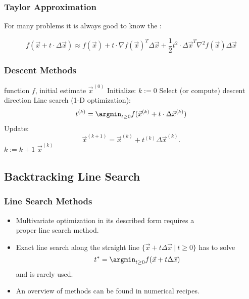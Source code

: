 \begin{frame}
  \frametitle{Taylor Approximation}
 
  For many problems it is always good to know the :

  \begin{displaymath}
    f(\vec x + t\cdot \Delta\vec x) 
    \approx f(\vec x) + t\cdot \nabla f(\vec x)^T \Delta \vec x +
      \frac{1}{2} t^2\cdot\Delta \vec x^T \nabla^2 f(\vec x)\Delta \vec x
  \end{displaymath}
\end{frame}


\begin{frame}
  \frametitle{Descent Methods \cont}
  
  \begin{algorithmic}
    \STATE {} function $f$, initial estimate $\vec x^{(0)}$
    \STATE Initialize: $k:=0$
    \REPEAT
      \STATE Select (or compute) descent direction 
      \STATE Line search (1-D optimization): $$t^{(k)}= \argmin_{t \geq 0}f(\vec x^{(k)}+t\cdot \Delta\vec x^{(k)})$$
      \STATE Update:
        \begin{displaymath}
          \vec x^{(k+1)} = \vec x^{(k)} + t^{(k)}\Delta \vec x^{(k)} .
        \end{displaymath}
      \STATE $k:=k+1$
    \STATE {} $\vec x^{(k)}$
  \end{algorithmic}
\end{frame}


\subsection{Backtracking Line Search}

\begin{frame}
  \frametitle{Line Search Methods}

  \begin{itemize}  
    \item Multivariate optimization in its described form requires a \\
      proper line search method.\\[.25cm]
    \item Exact line search along the straight line $\{\vec x + t\Delta \vec x ~|~ t \geq 0\}$ has to solve
      \begin{displaymath}
        t^* = \argmin_{t\geq 0} f(\vec  x + t\Delta \vec x)
      \end{displaymath}
      and is rarely used. \\[.25cm]
    \item An overview of methods can be found in numerical recipes.
  \end{itemize}
\end{frame}


